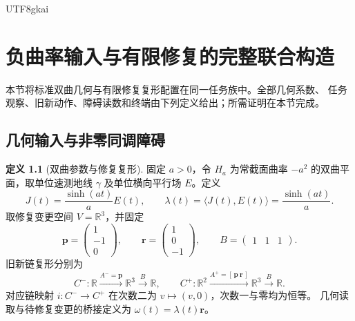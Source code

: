 \documentclass[12pt,a4paper,openany,notitlepage]{report}
\theoremstyle{plain}
\theoremstyle{definition}
\newtheorem{definition}[theorem]{定义}
\theoremstyle{remark}
\begin{document}
\begin{CJK*}{UTF8}{gkai}
\chapter{负曲率输入与有限修复的完整联合构造}
\label{exp:ch:joint}

\label{hgov:sec:joint}

本节将标准双曲几何与有限修复复形配置在同一任务族中。全部几何系数、
任务观察、旧新动作、障碍读数和终端由下列定义给出；所需证明在本节完成。

\section{几何输入与非零同调障碍}

\begin{definition}[双曲参数与修复复形]
\label{hgov:def:joint}
固定 $a>0$，令 $H_a$ 为常截面曲率 $-a^2$ 的双曲平面，取单位速测地线
$\gamma$ 及单位横向平行场 $E$。定义
\[
J(t)=\frac{\sinh(at)}aE(t),\qquad
\lambda(t)=\langle J(t),E(t)\rangle=\frac{\sinh(at)}a .
\]
取修复变更空间 $V=\mathbb R^3$，并固定
\[
\mathbf p=\begin{pmatrix}1\\-1\\0\end{pmatrix},\qquad
\mathbf r=\begin{pmatrix}1\\0\\-1\end{pmatrix},\qquad
B=\begin{pmatrix}1&1&1\end{pmatrix}.
\]
旧新链复形分别为
\[
C^-:\mathbb R\xrightarrow{A^-=\mathbf p}\mathbb R^3
\xrightarrow{B}\mathbb R,\qquad
C^+:\mathbb R^2\xrightarrow{A^+=[\,\mathbf p\ \mathbf r\,]}\mathbb R^3
\xrightarrow{B}\mathbb R.
\]
对应链映射 $i:C^-\to C^+$ 在次数二为 $v\mapsto(v,0)$，次数一与零均为恒等。
几何读取与待修复变更的桥接定义为
$\omega(t)=\lambda(t)\mathbf r$。
\end{definition}


\end{CJK*}
\end{document}
